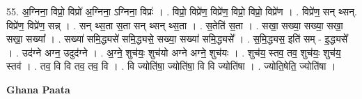 \documentclass[17pt]{extarticle}
\begin{document}
55. अ॒ग्निना॒ विप्रो॒ विप्रो॑ अ॒ग्निना॒ ऽग्निना॒ विप्रः॑ । . विप्रो॒ विप्रे॑ण॒ विप्रे॑ण॒ विप्रो॒ विप्रो॒ विप्रे॑ण । . विप्रे॑ण॒ सन् थ्सन्. विप्रे॑ण॒ विप्रे॑ण॒ सन्न् । . सन् थ्स॒ता स॒ता सन् थ्सन् थ्स॒ता । . स॒तेति॑ स॒ता । . सखा॒ सख्या॒ सख्या॒ सखा॒ सखा॒ सख्या᳚ । . सख्या॑ समि॒द्ध्यसे॑ समि॒द्ध्यसे॒ सख्या॒ सख्या॑ समि॒द्ध्यसे᳚ । . स॒मि॒द्ध्यस॒ इति॑ सम् - इ॒द्ध्यसे᳚ । . उद॑ग्ने अग्न॒ उदुद॑ग्ने । . अ॒ग्ने॒ शुच॑यः॒ शुच॑यो अग्ने अग्ने॒ शुच॑यः । . शुच॑य॒ स्तव॒ तव॒ शुच॑यः॒ शुच॑य॒ स्तव॑ । . तव॒ वि वि तव॒ तव॒ वि । . वि ज्योति॑षा॒ ज्योति॑षा॒ वि वि ज्योति॑षा । . ज्योति॒षेति॒ ज्योति॑षा । \newline

\textbf{Ghana Paata } \newline
\end{document}
